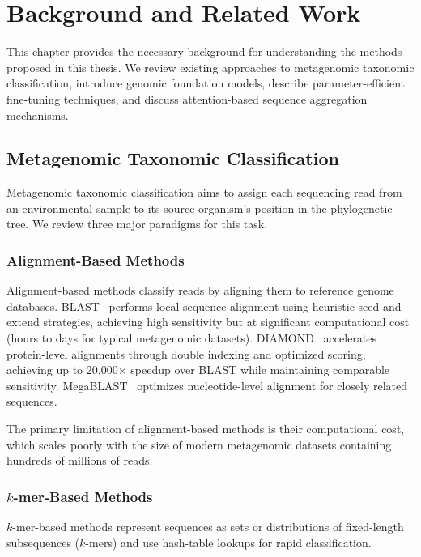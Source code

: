 
\chapter{Background and Related Work}
\label{ch:background}

This chapter provides the necessary background for understanding the methods proposed in this thesis. We review existing approaches to metagenomic taxonomic classification, introduce genomic foundation models, describe parameter-efficient fine-tuning techniques, and discuss attention-based sequence aggregation mechanisms.

\section{Metagenomic Taxonomic Classification}
\label{sec:bg-metagenomics}

Metagenomic taxonomic classification aims to assign each sequencing read from an environmental sample to its source organism's position in the phylogenetic tree. We review three major paradigms for this task.

\subsection{Alignment-Based Methods}

Alignment-based methods classify reads by aligning them to reference genome databases. 
BLAST~\cite{Altschul1990} performs local sequence alignment using heuristic seed-and-extend strategies, achieving high sensitivity but at significant computational cost (hours to days for typical metagenomic datasets). 
DIAMOND~\cite{Buchfink2015} accelerates protein-level alignments through double indexing and optimized scoring, achieving up to 20,000$\times$ speedup over BLAST while maintaining comparable sensitivity. 
MegaBLAST~\cite{Zhang2000} optimizes nucleotide-level alignment for closely related sequences.

The primary limitation of alignment-based methods is their computational cost, which scales poorly with the size of modern metagenomic datasets containing hundreds of millions of reads.

\subsection{$k$-mer-Based Methods}

$k$-mer-based methods represent sequences as sets or distributions of fixed-length subsequences ($k$-mers) and use hash-table lookups for rapid classification.

